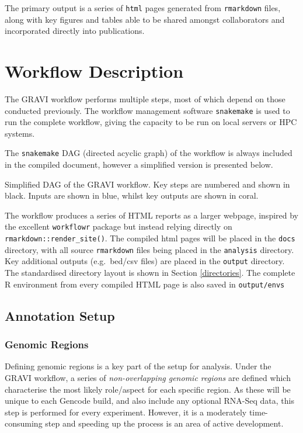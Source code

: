 \documentclass[
]{book}
\begin{document}
The primary output is a series of \texttt{html} pages generated from \texttt{rmarkdown} files, along with key figures and tables able to be shared amongst collaborators and incorporated directly into publications.

\hypertarget{workflow}{%
\chapter{Workflow Description}\label{workflow}}

The GRAVI workflow performs multiple steps, most of which depend on those conducted previously.
The workflow management software \texttt{snakemake}\citep{snakemake} is used to run the complete workflow, giving the capacity to be run on local servers or HPC systems.

The \texttt{snakemake} DAG (directed acyclic graph) of the workflow is always included in the compiled document, however a simplified version is presented below.

\label{fig:unnamed-chunk-3}Simplified DAG of the GRAVI workflow. Key steps are numbered and shown in black. Inputs are shown in blue, whilst key outputs are shown in coral.

The workflow produces a series of HTML reports as a larger webpage, inspired by the excellent \texttt{workflowr}\citep{workflowr} package but instead relying directly on \texttt{rmarkdown::render\_site()}\citep{R-rmarkdown}.
The compiled html pages will be placed in the \texttt{docs} directory, with all source \texttt{rmarkdown} files being placed in the \texttt{analysis} directory.
Key additional outputs (e.g.~bed/csv files) are placed in the \texttt{output} directory.
The standardised directory layout is shown in Section \ref{directories}.
The complete R environment from every compiled HTML page is also saved in \texttt{output/envs}

\hypertarget{annotation}{%
\section{Annotation Setup}\label{annotation}}

\hypertarget{genomic-regions}{%
\subsection*{Genomic Regions}\label{genomic-regions}}

Defining genomic regions is a key part of the setup for analysis.
Under the GRAVI workflow, a series of \emph{non-overlapping genomic regions} are defined which characterise the most likely role/aspect for each specific region.
As these will be unique to each Gencode build, and also include any optional RNA-Seq data, this step is performed for every experiment.
However, it is a moderately time-consuming step and speeding up the process is an area of active development.
\end{document}
